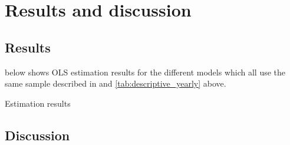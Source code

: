 \section{Results and discussion}

\subsection{Results}
\label{s:results}
 below shows OLS estimation results for the different models which all use the same sample described in  and \ref{tab:descriptive_yearly} above.

\begin{table}
    \centering
    \caption{Estimation results} \label{tab:results}
    
\end{table}

\subsection{Discussion}
\label{s:discussion}
\blindtext
